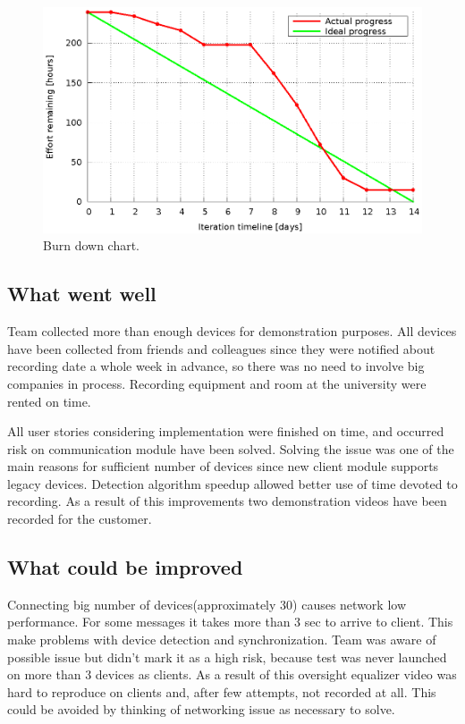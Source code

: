 \begin{figure}[h]
	\centering
		\includegraphics[width=14cm]{burndowns/sprint5.eps}
	\caption{Burn down chart.}
	\label{fig:Burn5 }
\end{figure}

\subsection{What went well}
Team collected more than enough devices for demonstration purposes. All devices have been collected from friends and colleagues since they were notified about recording date a whole week in advance, so there was no need to involve big companies in process. Recording equipment and room at the university were rented on time. 

All user stories considering implementation were finished on time, and occurred risk on communication module have been solved. Solving the issue was one of the main reasons for sufficient number of devices since new client module supports legacy devices. Detection algorithm speedup allowed better use of time devoted to recording. As a result of this improvements two demonstration videos have been recorded for the customer.


\subsection{What could be improved}
Connecting big number of devices(approximately 30) causes network low performance. For some messages it takes more than 3 sec to arrive to client. This make problems with device detection and synchronization. Team was aware of possible issue but didn't mark it as a high risk, because test was never launched on more than 3 devices as clients. As a result of this oversight equalizer video was hard to reproduce on clients and, after few attempts, not recorded at all. This could be avoided by thinking of networking issue as necessary to solve.

